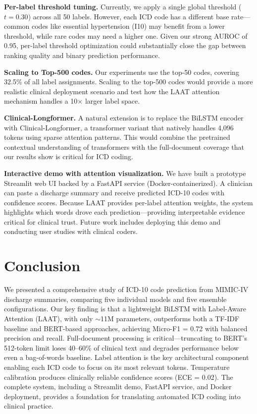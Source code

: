 \documentclass[11pt,a4paper]{article}
\begin{document}
\textbf{Per-label threshold tuning.} Currently, we apply a single global threshold ($t = 0.30$) across all 50 labels. However, each ICD code has a different base rate---common codes like essential hypertension (I10) may benefit from a lower threshold, while rare codes may need a higher one. Given our strong AUROC of 0.95, per-label threshold optimization could substantially close the gap between ranking quality and binary prediction performance.

\textbf{Scaling to Top-500 codes.} Our experiments use the top-50 codes, covering 32.5\% of all label assignments. Scaling to the top-500 codes would provide a more realistic clinical deployment scenario and test how the LAAT attention mechanism handles a 10$\times$ larger label space.

\textbf{Clinical-Longformer.} A natural extension is to replace the BiLSTM encoder with Clinical-Longformer, a transformer variant that natively handles 4,096 tokens using sparse attention patterns. This would combine the pretrained contextual understanding of transformers with the full-document coverage that our results show is critical for ICD coding.

\textbf{Interactive demo with attention visualization.} We have built a prototype Streamlit web UI backed by a FastAPI service (Docker-containerized). A clinician can paste a discharge summary and receive predicted ICD-10 codes with confidence scores. Because LAAT provides per-label attention weights, the system highlights which words drove each prediction---providing interpretable evidence critical for clinical trust. Future work includes deploying this demo and conducting user studies with clinical coders.

\section{Conclusion}

We presented a comprehensive study of ICD-10 code prediction from MIMIC-IV discharge summaries, comparing five individual models and five ensemble configurations. Our key finding is that a lightweight BiLSTM with Label-Aware Attention (LAAT), with only $\sim$11M parameters, outperforms both a TF-IDF baseline and BERT-based approaches, achieving Micro-F1 = 0.72 with balanced precision and recall. Full-document processing is critical---truncating to BERT's 512-token limit loses 40--60\% of clinical text and degrades performance below even a bag-of-words baseline. Label attention is the key architectural component enabling each ICD code to focus on its most relevant tokens. Temperature calibration produces clinically reliable confidence scores (ECE = 0.02). The complete system, including a Streamlit demo, FastAPI service, and Docker deployment, provides a foundation for translating automated ICD coding into clinical practice.
\end{document}
